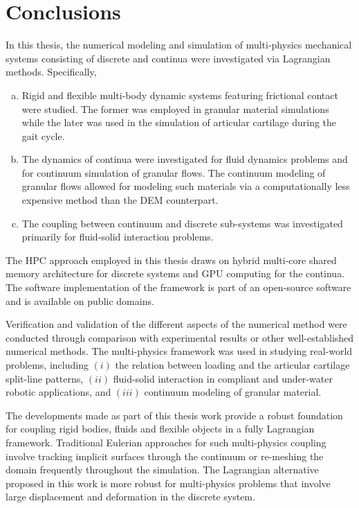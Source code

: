 

\chapter{Conclusions}
\label{chap:conclusions}
In this thesis, the numerical modeling and simulation of multi-physics mechanical systems consisting of discrete and continua were investigated via Lagrangian methods.  Specifically, 
\begin{enumerate}[(a)]
	\item Rigid and flexible multi-body dynamic systems featuring frictional contact were studied.  The former was employed in granular material simulations while the later was used in the simulation of articular cartilage during the gait cycle.
	\item The dynamics of continua were investigated for fluid dynamics problems and for continuum simulation of granular flows. The continuum modeling of granular flows allowed for modeling such materials via a computationally less expensive method than the DEM counterpart.
	\item The coupling between continuum and discrete sub-systems was investigated primarily for fluid-solid interaction problems. 	
\end{enumerate}
 The HPC approach employed in this thesis draws on hybrid multi-core shared memory architecture for discrete systems and GPU computing for the continua. The software implementation of the framework is part of an open-source software and is available on public domains.

Verification and validation of the different aspects of the numerical method were conducted through comparison with experimental results or other well-established numerical methods. The  multi-physics framework was used in studying real-world problems, including $(i)$ the relation between loading and the articular cartilage split-line patterns, $(ii)$ fluid-solid interaction in compliant and under-water robotic applications, and $(iii)$ continuum modeling of granular material.  

The developments made as part of this thesis work provide a robust foundation for coupling rigid bodies, fluids and flexible objects in a fully Lagrangian framework. Traditional Eulerian approaches for such multi-physics coupling involve tracking implicit surfaces through the continuum or re-meshing the domain frequently throughout the simulation. The Lagrangian alternative proposed in this work is more robust for multi-physics problems that involve large displacement and deformation in the discrete system.

